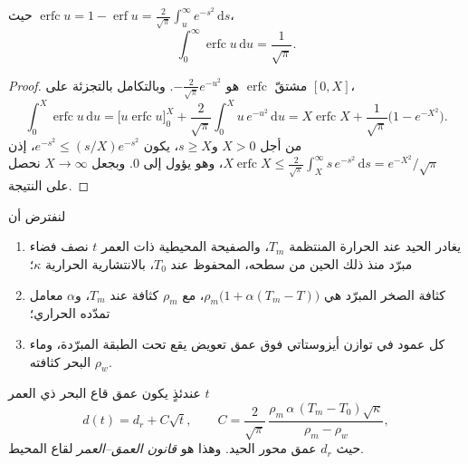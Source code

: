 \begin{lemma}\label{lem:b1:rifts-ridges-margins:erfc}
حيث $\operatorname{erfc} u = 1 - \operatorname{erf} u =
\frac{2}{\sqrt\pi}\int_u^\infty e^{-s^2}\,\mathrm ds$،
\[
  \int_0^\infty \operatorname{erfc} u \,\mathrm du = \frac{1}{\sqrt\pi}.
\]
\end{lemma}

\begin{proof}
مشتقّ $\operatorname{erfc}$ هو $-\frac{2}{\sqrt\pi}e^{-u^2}$. وبالتكامل بالتجزئة على $[0, X]$،
\[
  \int_0^X \operatorname{erfc} u\,\mathrm du
  = \bigl[u \operatorname{erfc} u\bigr]_0^X + \frac{2}{\sqrt\pi}\int_0^X u\,e^{-u^2}\,\mathrm du
  = X\operatorname{erfc} X + \frac{1}{\sqrt\pi}\bigl(1 - e^{-X^2}\bigr).
\]
من أجل $X > 0$ و$s \ge X$، يكون $e^{-s^2} \le (s/X)e^{-s^2}$، إذن
$X\operatorname{erfc} X \le \frac{2}{\sqrt\pi}\int_X^\infty s\,e^{-s^2}\,\mathrm ds
= e^{-X^2}/\sqrt\pi$، وهو يؤول إلى 0. وبجعل $X \to \infty$ نحصل على النتيجة.
\end{proof}

\begin{theorem}\label{thm:b1:rifts-ridges-margins:depth-age}
لنفترض أن
\begin{enumerate}
  \item يغادر  الحيد عند الحرارة المنتظمة $T_m$، والصفيحة المحيطية ذات العمر $t$ نصف فضاء مبرّد منذ ذلك الحين من سطحه، المحفوظ عند $T_0$، بالانتشارية الحرارية $\kappa$؛
  \item كثافة الصخر المبرّد هي $\rho_m\bigl(1 + \alpha(T_m -
        T)\bigr)$، مع $\rho_m$ كثافة  عند $T_m$، و$\alpha$ معامل تمدّده الحراري؛
  \item كل عمود في توازن أيزوستاتي فوق عمق تعويض يقع تحت الطبقة المبرّدة، وماء البحر كثافته $\rho_w$.
\end{enumerate}
عندئذٍ يكون عمق قاع البحر ذي العمر $t$
\[
  d(t) = d_r + C\sqrt t, \qquad
  C = \frac{2}{\sqrt\pi}\,\frac{\rho_m\,\alpha\,(T_m - T_0)\sqrt\kappa}{\rho_m - \rho_w},
\]
حيث $d_r$ عمق محور الحيد. وهذا هو \emph{قانون العمق–العمر} لقاع المحيط.
\end{theorem}

